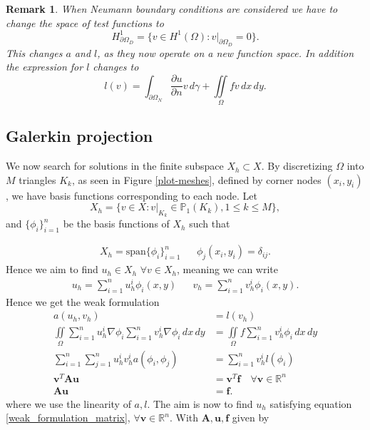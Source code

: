 \documentclass[11pt,a4paper,english]{elsarticle}%
\newcommand{\restr}[2]{\ensuremath{\left.#1\right|_{#2}}}
\newtheorem*{remark}{Remark}
\begin{document}
\begin{remark}
    When Neumann boundary conditions are considered we have to change the space of test functions to 
    \begin{equation}
        H^1_{\partial \Omega_D } = \{v \in H^1(\Omega):\restr{v}{\partial \Omega_D }=0 \}.
    \end{equation}
    This changes $a$ and $l$, as they now operate on a new function space. In addition the expression for $l$ changes to
    \begin{equation}
        l(v) = \int_{\partial \Omega_N} \frac{\partial u}{\partial n} v \, d\gamma + \iint\limits_{\Omega} f v  \, dx \, dy.
        \label{neumann-conditions}
    \end{equation}
\end{remark}

\subsection{Galerkin projection}

We now search for solutions in the finite subspace $X_h \subset X$. 
By discretizing $\Omega$ into $M$ triangles $K_k$, as seen in Figure \ref{plot-meshes}, defined by corner nodes $(x_i,y_i)$, we have basis functions corresponding to each node.
Let 
\begin{equation*}
X_h = \{ v \in X : v|_{K_k} \in \mathbb{P}_1 (K_k),1\leq k\leq M \},
\end{equation*}
and $\{\phi_i\}_{i=1}^n$ be the basis functions of $X_h$ such that

\begin{equation*}
    \begin{aligned}
X_h = \text{span} \{\phi_i\}_{i=1}^n & & \phi_j(x_i,y_i) = \delta_{ij}.
    \end{aligned}
\end{equation*}
Hence we aim to find $u_h \in X_h$ $\forall v \in X_h$, meaning we can write
\begin{equation*}
    \begin{aligned}
u_h = \sum_{i=1}^n u_h^i \phi_i(x,y) & & v_h = \sum_{i=1}^n v_h^i \phi_i(x,y).
    \end{aligned}
\end{equation*}
Hence we get the weak formulation
\begin{equation}
\begin{aligned}
a(u_h,v_h) &= l(v_h) 
\\
\iint\limits_{\Omega} 
\sum_{i=1}^n u_h^i \nabla \phi_i \sum_{i=1}^n v_h^i \nabla\phi_i \, dx \, dy 
&= \iint\limits_{\Omega} f \sum_{i=1}^n v_h^i \phi_i \, dx \, dy
\\
\sum_{i=1}^n\sum_{j=1}^n u_h^i v_h^i a(\phi_i,\phi_j) &= \sum_{i=1}^n v_h^i l(\phi_i)
\\
\bm v^T\bm A \bm u &= \bm v^T \bm f \quad \forall \bm v \in \mathbb R^n
\\ \bm A \bm u &= \bm f.
\label{weak_formulation_matrix}
\end{aligned}
\end{equation}
where we use the linearity of $a,l$. 
The aim is now to find $u_h$ satisfying equation \eqref{weak_formulation_matrix}, $\forall \bm v \in \mathbb R^n$.
With $\bm A, \bm u, \bm f$ given by
\end{document}
